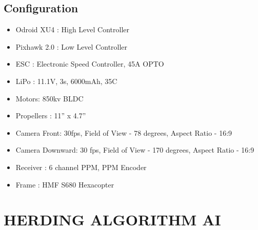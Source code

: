 \documentclass[12pt]{article}
\begin{document}
\subsection{Configuration}
\begin{itemize}
    \item Odroid XU4 : High Level Controller
    \item Pixhawk 2.0 : Low Level Controller
    \item ESC     : Electronic Speed Controller, 45A OPTO
    \item LiPo     : 11.1V, 3s, 6000mAh, 35C
    \item Motors: 850kv BLDC
    \item Propellers : 11” x 4.7”
    \item Camera Front: 30fps, Field of View - 78 degrees, Aspect Ratio - 16:9
    \item Camera Downward: 30 fps, Field of View - 170 degrees, Aspect Ratio - 16:9
    \item Receiver : 6 channel PPM, PPM Encoder
    \item Frame : HMF S680 Hexacopter
\end{itemize}

\section{HERDING ALGORITHM AI}
\end{document}
